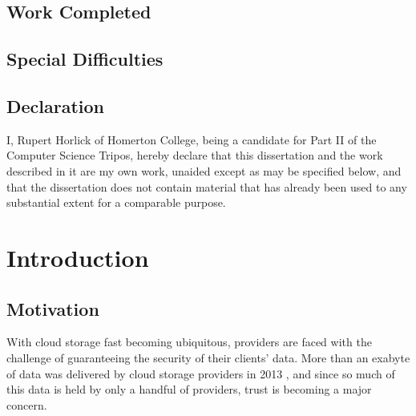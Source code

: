 \documentclass[12pt,a4paper,twoside,openright]{report}
\begin{document}

\section*{Work Completed}



\section*{Special Difficulties}



\newpage
\section*{Declaration}

I, Rupert Horlick of Homerton College, being a candidate for Part II of the Computer
Science Tripos, hereby declare
that this dissertation and the work described in it are my own work,
unaided except as may be specified below, and that the dissertation
does not contain material that has already been used to any substantial
extent for a comparable purpose.

\bigskip
{}

\medskip
{}

\tableofcontents

\listoffigures



\pagestyle{headings}

\chapter{Introduction}

\section{Motivation}

With cloud storage fast becoming ubiquitous, providers are faced with the challenge of guaranteeing the security of their clients' data. 
More than an exabyte of data was delivered by cloud storage providers in 2013 \cite{nasuni2013cloud}, and since so much of this data is held by only a handful of providers, trust is becoming a major concern.
\end{document}
